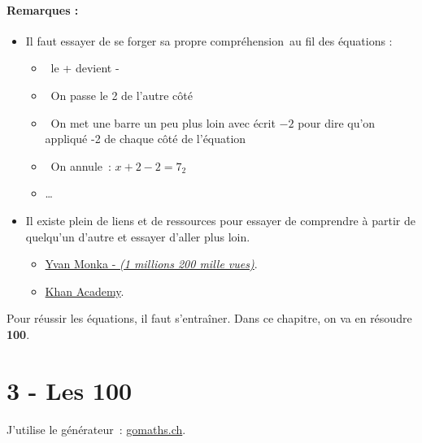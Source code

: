 \documentclass[11pt]{article}
\begin{document}
\paragraph{Remarques : }
\begin{itemize}
    \item Il faut essayer de se forger sa propre compréhension au fil des équations : 
    \begin{itemize}
        \item \og le + devient - \fg
        \item \og On passe le 2 de l’autre côté \fg
        \item \og On met une barre un peu plus loin avec écrit $-2$ pour dire qu’on appliqué -2 de chaque côté de l’équation \fg
        \item \og On annule : $x + 2 - 2 = 7 _ 2$ \fg
        \item \og…
    \end{itemize}

    \item Il existe plein de liens et de ressources pour essayer de comprendre à partir de quelqu’un d’autre et essayer d’aller plus loin.
    \begin{itemize}
        \item \href{https://www.youtube.com/watch?v=uV_EmbYu9_E}{Yvan Monka - \textit{(1 millions 200 mille vues)}}.
        \item \href{https://fr.khanacademy.org/math/be-2eme-secondaire2/x291d358f50a246d9:algebre-1/x291d358f50a246d9:equations/a/multi-step-equations-review}{Khan Academy}.
    \end{itemize}
\end{itemize}   

\begin{center}
    Pour réussir les équations, il faut s’entraîner. Dans ce chapitre, on va en résoudre \textbf{100}.
\end{center}

\newpage

\section*{3 - Les 100}

J’utilise le générateur : \href{https://gomaths.ch/print_alg_equ1d.php?nb_calcul=30&niveau=3}{gomaths.ch}.
\end{document}
